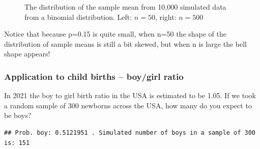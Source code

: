 \begin{knitrout}
\begin{figure}
{}

\caption[The distribution of the sample mean from 10,000 simulated data from a binomial distribution]{The distribution of the sample mean from 10,000 simulated data from a binomial distribution. Left: $n=50$, right: $n=500$}\label{fig:intro-lln5-2}
\end{figure}

\begin{kframe}\begin{alltt}
\hlstd{(}\hlstd{=}\hlstd{(}\hlstd{,}\hlstd{))}
\end{alltt}
\end{kframe}
\end{knitrout}

Notice that because p=0.15 is quite small, when n=50 the shape of the distribution of sample means is still a bit skewed, but when n is large the bell shape appears! 

\subsubsection{Application to child births -- boy/girl ratio}
In 2021 the boy to girl birth ratio in the USA is estimated to be 1.05. If we took a random sample of 300 newborns across the USA, how many do you expect to be boys?

\begin{knitrout}
\color{fgcolor}\begin{kframe}
\begin{alltt}
 \hlkwb{<-}  
 \hlkwb{<-} \hlopt{/}\hlstd{(}\hlopt{+}\hlstd{)}
 \hlkwb{<-} 
 \hlkwb{<-} 
\hlstd{(}\hlstd{)}
 \hlkwb{<-} 
\hlstd{(} \hlstd{,} \hlstd{)}
\end{alltt}
\begin{verbatim}
## Prob. boy: 0.5121951 . Simulated number of boys in a sample of 300 is: 151
\end{verbatim}
\end{kframe}
\end{knitrout}

